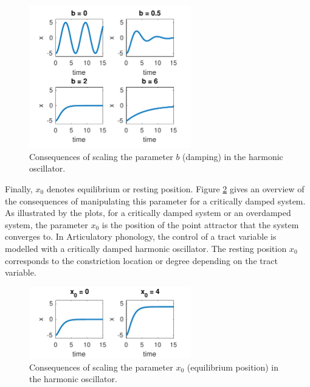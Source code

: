 \begin{figure}[htp]
\begin{center}
\includegraphics[width=7cm]{figures/ch3/dho_damping.pdf}
\caption{Consequences of scaling the parameter $b$ (damping) in the harmonic oscillator.}
\label{fig:dho_damp}
\end{center}
\end{figure}

\hspace*{-1mm}Finally, $x_0$ denotes equilibrium or resting position. Figure \ref{fig:dho_rest} gives an over\-view of the consequences of manipulating this parameter for a critically damped system. As illustrated by the plots, for a critically damped system or an overdamped system, the parameter $x_0$ is the position of the point attractor that the system converges to. In Articulatory phonology, the control of a tract variable is modelled with a critically damped harmonic oscillator. The resting position $x_0$ corresponds to the constriction location or degree depending on the tract variable. 

\begin{figure}[htp]
\begin{center}
\includegraphics[width=7cm]{figures/ch3/dho_x0.pdf}
\caption{Consequences of scaling the parameter $x_0$ (equilibrium position) in the harmonic oscillator.}
\label{fig:dho_rest}
\end{center}
\end{figure}

